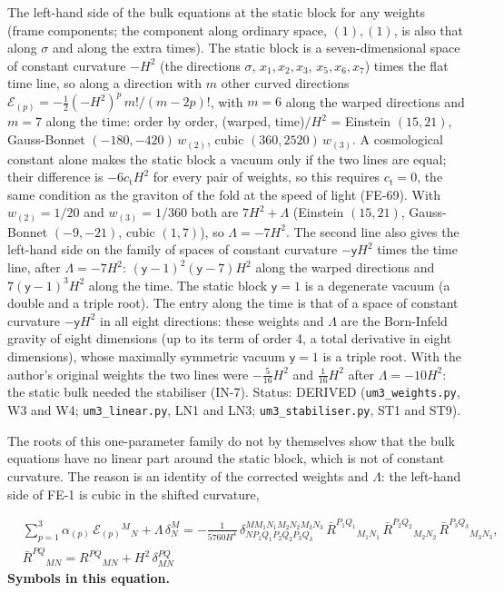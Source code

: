 \documentclass[
  10pt,
]{article}
\begin{document}
The left-hand side of the bulk equations at the static block for any
weights (frame components; the component along ordinary space,
\((1), (1)\), is also that along \(\sigma\) and along the extra times).
The static block is a seven-dimensional space of constant curvature
\(-H^2\) (the directions \(\sigma\), \(x_1, x_2, x_3\),
\(x_5, x_6, x_7\)) times the flat time line, so along a direction with
\(m\) other curved directions
\(\mathcal{E}_{(p)} = -\frac12(-H^2)^p\,m!/(m - 2p)!\), with \(m = 6\)
along the warped directions and \(m = 7\) along the time: order by
order, (warped, time)\(/H^2\) = Einstein \((15, 21)\), Gauss-Bonnet
\((-180, -420)\,w_{(2)}\), cubic \((360, 2520)\,w_{(3)}\). A
cosmological constant alone makes the static block a vacuum only if the
two lines are equal; their difference is \(-6c_{\mathrm{t}}H^2\) for
every pair of weights, so this requires \(c_{\mathrm{t}} = 0\), the same
condition as the graviton of the fold at the speed of light (FE-69).
With \(w_{(2)} = 1/20\) and \(w_{(3)} = 1/360\) both are
\(7H^2 + \Lambda\) (Einstein \((15, 21)\), Gauss-Bonnet \((-9, -21)\),
cubic \((1, 7)\)), so \(\Lambda = -7H^2\). The second line also gives
the left-hand side on the family of spaces of constant curvature
\(-\mathsf{y}H^2\) times the time line, after \(\Lambda = -7H^2\):
\((\mathsf{y} - 1)^2(\mathsf{y} - 7)H^2\) along the warped directions
and \(7(\mathsf{y} - 1)^3H^2\) along the time. The static block
\(\mathsf{y} = 1\) is a degenerate vacuum (a double and a triple root).
The entry along the time is that of a space of constant curvature
\(-\mathsf{y}H^2\) in all eight directions: these weights and
\(\Lambda\) are the Born-Infeld gravity of eight dimensions (up to its
term of order 4, a total derivative in eight dimensions), whose
maximally symmetric vacuum \(\mathsf{y} = 1\) is a triple root. With the
author's original weights the two lines were \(-\frac{5}{16}H^2\) and
\(\frac{1}{16}H^2\) after \(\Lambda = -10H^2\): the static bulk needed
the stabiliser (IN-7). Status: DERIVED (\texttt{um3\_weights.py}, W3 and
W4; \texttt{um3\_linear.py}, LN1 and LN3; \texttt{um3\_stabiliser.py},
ST1 and ST9).

The roots of this one-parameter family do not by themselves show that
the bulk equations have no linear part around the static block, which is
not of constant curvature. The reason is an identity of the corrected
weights and \(\Lambda\): the left-hand side of FE-1 is cubic in the
shifted curvature,

\[
\begin{aligned}
&\sum_{p=1}^{3}\alpha_{(p)}\,\mathcal{E}_{(p)}{}^M{}_N + \Lambda\,\delta^M_N = -\frac{1}{5760H^4}\,
\delta^{MM_1N_1M_2N_2M_3N_3}_{NP_1Q_1P_2Q_2P_3Q_3}\,\bar R^{P_1Q_1}{}_{M_1N_1}\,\bar R^{P_2Q_2}{}_{M_2N_2}\,\bar R^{P_3Q_3}{}_{M_3N_3},\\
&\bar R^{PQ}{}_{MN} = R^{PQ}{}_{MN} + H^2\,\delta^{PQ}_{MN}
\end{aligned}
\] \textbf{Symbols in this equation.}
\end{document}
